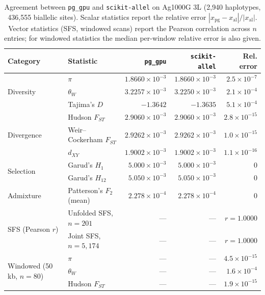 \documentclass[12pt]{article}
\newcommand{\pggpu}{\texttt{pg\_gpu}\xspace}
\newcommand{\scikitallel}{\texttt{scikit-allel}\xspace}
\begin{document}
\begin{table}[ht]
\centering
\small
\caption{Agreement between \pggpu and \scikitallel on Ag1000G 3L
(2{,}940 haplotypes, 436{,}555 biallelic sites). Scalar statistics report
the relative error $|x_{\text{pg}} - x_{\text{al}}| / |x_{\text{al}}|$.
Vector statistics (SFS, windowed scans) report the Pearson correlation
across $n$ entries; for windowed statistics the median per-window
relative error is also given.}
\label{tab:accuracy}
\begin{tabular}{llrrr}
\toprule
\textbf{Category} & \textbf{Statistic} & \textbf{\pggpu} & \textbf{\scikitallel} & \textbf{Rel. error} \\
\midrule
\multirow{3}{*}{Diversity}
 & $\pi$ & $1.8660 \times 10^{-3}$ & $1.8660 \times 10^{-3}$ & $2.5 \times 10^{-7}$ \\
 & $\theta_W$ & $3.2257 \times 10^{-3}$ & $3.2250 \times 10^{-3}$ & $2.1 \times 10^{-4}$ \\
 & Tajima's $D$ & $-1.3642$ & $-1.3635$ & $5.1 \times 10^{-4}$ \\
\midrule
\multirow{3}{*}{Divergence}
 & Hudson $F_{ST}$ & $2.9060 \times 10^{-3}$ & $2.9060 \times 10^{-3}$ & $2.8 \times 10^{-15}$ \\
 & Weir--Cockerham $F_{ST}$ & $2.9262 \times 10^{-3}$ & $2.9262 \times 10^{-3}$ & $1.0 \times 10^{-15}$ \\
 & $d_{XY}$ & $1.9002 \times 10^{-3}$ & $1.9002 \times 10^{-3}$ & $1.1 \times 10^{-16}$ \\
\midrule
\multirow{2}{*}{Selection}
 & Garud's $H_1$ & $5.000 \times 10^{-3}$ & $5.000 \times 10^{-3}$ & $0$ \\
 & Garud's $H_{12}$ & $5.050 \times 10^{-3}$ & $5.050 \times 10^{-3}$ & $0$ \\
\midrule
Admixture & Patterson's $F_2$ (mean) & $2.278 \times 10^{-4}$ & $2.278 \times 10^{-4}$ & $0$ \\
\midrule
\multirow{2}{*}{SFS (Pearson $r$)}
 & Unfolded SFS, $n{=}201$ & --- & --- & $r = 1.0000$ \\
 & Joint SFS, $n{=}5{,}174$ & --- & --- & $r = 1.0000$ \\
\midrule
\multirow{3}{*}{Windowed (50\,kb, $n{=}80$)}
 & $\pi$ & --- & --- & $4.5 \times 10^{-15}$ \\
 & $\theta_W$ & --- & --- & $1.6 \times 10^{-4}$ \\
 & Hudson $F_{ST}$ & --- & --- & $1.9 \times 10^{-15}$ \\
\bottomrule
\end{tabular}
\end{table}
\end{document}
